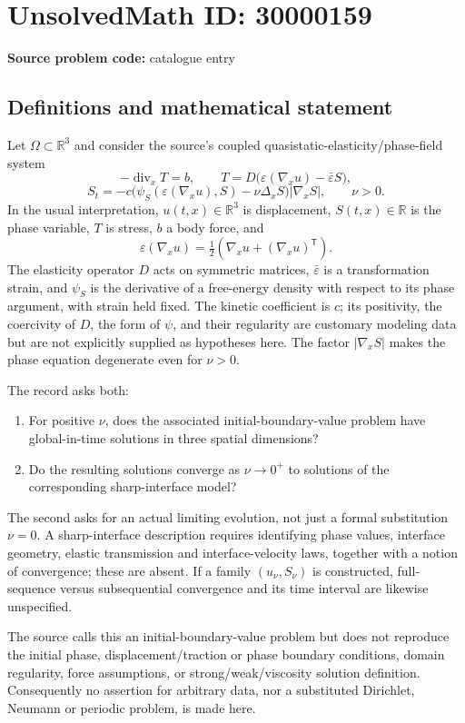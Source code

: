 \documentclass[11pt]{article}
\newcommand{\R}{\mathbb{R}}
\begin{document}
\section*{UnsolvedMath ID: 30000159}
\textbf{Source problem code:} catalogue entry
\subsection{Definitions and mathematical statement}
Let $\Omega\subset\R^3$ and consider the source's coupled quasistatic-elasticity/phase-field system
\[
 -\operatorname{div}_x T=b,\qquad
 T=D\bigl(\varepsilon(\nabla_xu)-\bar\varepsilon S\bigr),
\]
\[
 S_t=-c\bigl(\psi_S(\varepsilon(\nabla_xu),S)-\nu\Delta_xS\bigr)
                       |\nabla_xS|,\qquad \nu>0.
\]
In the usual interpretation, $u(t,x)\in\R^3$ is displacement, $S(t,x)\in\R$ is the phase variable, $T$ is stress, $b$ a body force, and
\[
 \varepsilon(\nabla_xu)=\tfrac12(\nabla_xu+(\nabla_xu)^{\mathsf T}).
\]
The elasticity operator $D$ acts on symmetric matrices, $\bar\varepsilon$ is a transformation strain, and $\psi_S$ is the derivative of a free-energy density with respect to its phase argument, with strain held fixed. The kinetic coefficient is $c$; its positivity, the coercivity of $D$, the form of $\psi$, and their regularity are customary modeling data but are not explicitly supplied as hypotheses here. The factor $|\nabla_xS|$ makes the phase equation degenerate even for $\nu>0$.

The record asks both:
\begin{enumerate}
\item For positive $\nu$, does the associated initial-boundary-value problem have global-in-time solutions in three spatial dimensions?
\item Do the resulting solutions converge as $\nu\to0^+$ to solutions of the corresponding sharp-interface model?
\end{enumerate}
The second asks for an actual limiting evolution, not just a formal substitution $\nu=0$. A sharp-interface description requires identifying phase values, interface geometry, elastic transmission and interface-velocity laws, together with a notion of convergence; these are absent. If a family $(u_\nu,S_\nu)$ is constructed, full-sequence versus subsequential convergence and its time interval are likewise unspecified.

The source calls this an initial-boundary-value problem but does not reproduce the initial phase, displacement/traction or phase boundary conditions, domain regularity, force assumptions, or strong/weak/viscosity solution definition. Consequently no assertion for arbitrary data, nor a substituted Dirichlet, Neumann or periodic problem, is made here.
\end{document}
